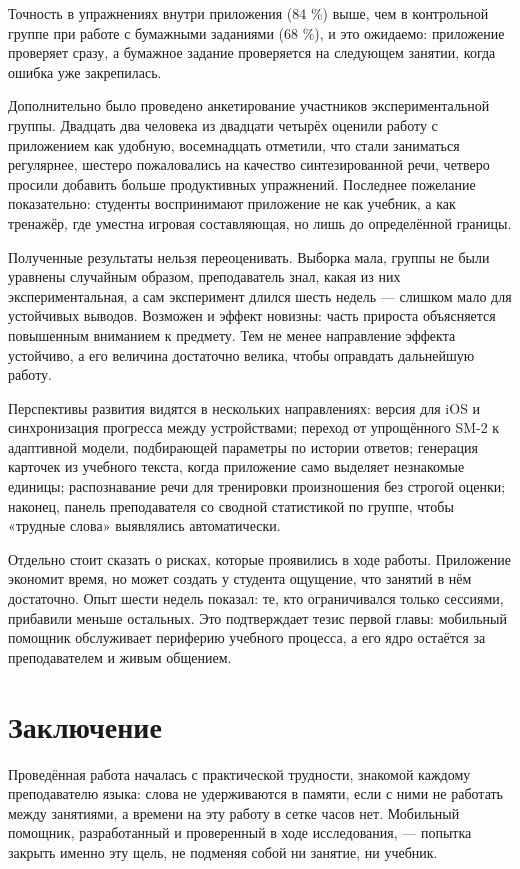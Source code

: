 \documentclass[11pt,a4paper,openany]{report}
\begin{document}
Точность в упражнениях внутри приложения (84 \%) выше, чем в контрольной группе при работе с бумажными заданиями (68 \%), и это ожидаемо: приложение проверяет сразу, а бумажное задание проверяется на следующем занятии, когда ошибка уже закрепилась.

Дополнительно было проведено анкетирование участников экспериментальной группы. Двадцать два человека из двадцати четырёх оценили работу с приложением как удобную, восемнадцать отметили, что стали заниматься регулярнее, шестеро пожаловались на качество синтезированной речи, четверо просили добавить больше продуктивных упражнений. Последнее пожелание показательно: студенты воспринимают приложение не как учебник, а как тренажёр, где уместна игровая составляющая, но лишь до определённой границы.

Полученные результаты нельзя переоценивать. Выборка мала, группы не были уравнены случайным образом, преподаватель знал, какая из них экспериментальная, а сам эксперимент длился шесть недель — слишком мало для устойчивых выводов. Возможен и эффект новизны: часть прироста объясняется повышенным вниманием к предмету. Тем не менее направление эффекта устойчиво, а его величина достаточно велика, чтобы оправдать дальнейшую работу.

Перспективы развития видятся в нескольких направлениях: версия для iOS и синхронизация прогресса между устройствами; переход от упрощённого SM-2 к адаптивной модели, подбирающей параметры по истории ответов; генерация карточек из учебного текста, когда приложение само выделяет незнакомые единицы; распознавание речи для тренировки произношения без строгой оценки; наконец, панель преподавателя со сводной статистикой по группе, чтобы «трудные слова» выявлялись автоматически.

Отдельно стоит сказать о рисках, которые проявились в ходе работы. Приложение экономит время, но может создать у студента ощущение, что занятий в нём достаточно. Опыт шести недель показал: те, кто ограничивался только сессиями, прибавили меньше остальных. Это подтверждает тезис первой главы: мобильный помощник обслуживает периферию учебного процесса, а его ядро остаётся за преподавателем и живым общением.

\chapter*{Заключение}

Проведённая работа началась с практической трудности, знакомой каждому преподавателю языка: слова не удерживаются в памяти, если с ними не работать между занятиями, а времени на эту работу в сетке часов нет. Мобильный помощник, разработанный и проверенный в ходе исследования, — попытка закрыть именно эту щель, не подменяя собой ни занятие, ни учебник.
\end{document}
